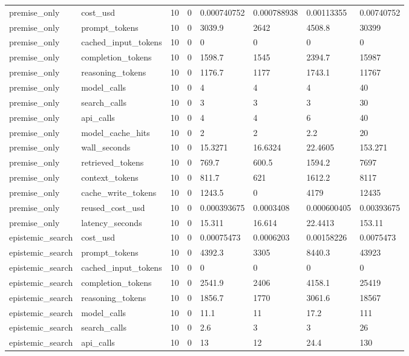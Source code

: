 \begin{tabular}{llllllll}
premise\_only & cost\_usd & 10 & 0 & 0.000740752 & 0.000788938 & 0.00113355 & 0.00740752 \\
premise\_only & prompt\_tokens & 10 & 0 & 3039.9 & 2642 & 4508.8 & 30399 \\
premise\_only & cached\_input\_tokens & 10 & 0 & 0 & 0 & 0 & 0 \\
premise\_only & completion\_tokens & 10 & 0 & 1598.7 & 1545 & 2394.7 & 15987 \\
premise\_only & reasoning\_tokens & 10 & 0 & 1176.7 & 1177 & 1743.1 & 11767 \\
premise\_only & model\_calls & 10 & 0 & 4 & 4 & 4 & 40 \\
premise\_only & search\_calls & 10 & 0 & 3 & 3 & 3 & 30 \\
premise\_only & api\_calls & 10 & 0 & 4 & 4 & 6 & 40 \\
premise\_only & model\_cache\_hits & 10 & 0 & 2 & 2 & 2.2 & 20 \\
premise\_only & wall\_seconds & 10 & 0 & 15.3271 & 16.6324 & 22.4605 & 153.271 \\
premise\_only & retrieved\_tokens & 10 & 0 & 769.7 & 600.5 & 1594.2 & 7697 \\
premise\_only & context\_tokens & 10 & 0 & 811.7 & 621 & 1612.2 & 8117 \\
premise\_only & cache\_write\_tokens & 10 & 0 & 1243.5 & 0 & 4179 & 12435 \\
premise\_only & reused\_cost\_usd & 10 & 0 & 0.000393675 & 0.0003408 & 0.000600405 & 0.00393675 \\
premise\_only & latency\_seconds & 10 & 0 & 15.311 & 16.614 & 22.4413 & 153.11 \\
epistemic\_search & cost\_usd & 10 & 0 & 0.00075473 & 0.0006203 & 0.00158226 & 0.0075473 \\
epistemic\_search & prompt\_tokens & 10 & 0 & 4392.3 & 3305 & 8440.3 & 43923 \\
epistemic\_search & cached\_input\_tokens & 10 & 0 & 0 & 0 & 0 & 0 \\
epistemic\_search & completion\_tokens & 10 & 0 & 2541.9 & 2406 & 4158.1 & 25419 \\
epistemic\_search & reasoning\_tokens & 10 & 0 & 1856.7 & 1770 & 3061.6 & 18567 \\
epistemic\_search & model\_calls & 10 & 0 & 11.1 & 11 & 17.2 & 111 \\
epistemic\_search & search\_calls & 10 & 0 & 2.6 & 3 & 3 & 26 \\
epistemic\_search & api\_calls & 10 & 0 & 13 & 12 & 24.4 & 130 \\

\end{tabular}
